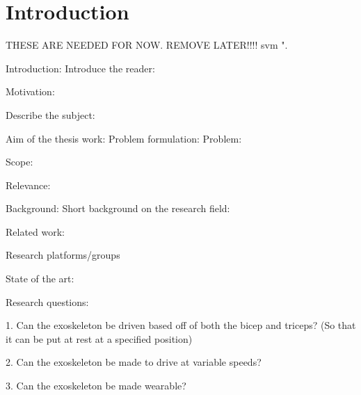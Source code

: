 \section{Introduction}
\label{section:intro}

THESE ARE NEEDED FOR NOW. REMOVE LATER!!!! \cite{IEEEtran, IEEEtranformatexample, webpage, FundConDep, exampleofjournalarticle, exampleofconferencepaper}
\ac{svm} \cite{exampleofconferencepaper}".

Introduction:
    Introduce the reader:

    Motivation:

    Describe the subject:

    Aim of the thesis work:
        Problem formulation: %
            Problem:

            Scope:
            
            Relevance:


Background: 
    Short background on the research field:

    Related work:

    Research platforms/groups

    State of the art:





Research questions:

1.	Can the exoskeleton be driven based off of both the bicep and triceps? (So that it can be put at rest at a specified position)

2.	Can the exoskeleton be made to drive at variable speeds?

3.	Can the exoskeleton be made wearable?

